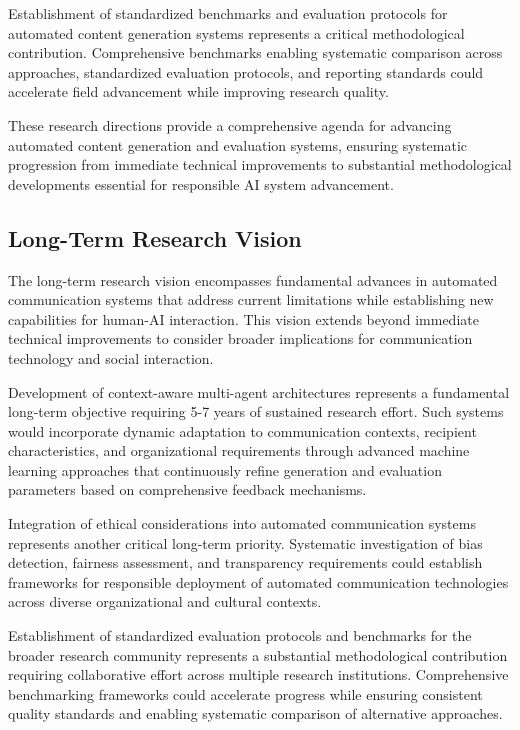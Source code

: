 Establishment of standardized benchmarks and evaluation protocols for automated content generation systems represents a critical methodological contribution. Comprehensive benchmarks enabling systematic comparison across approaches, standardized evaluation protocols, and reporting standards could accelerate field advancement while improving research quality.

These research directions provide a comprehensive agenda for advancing automated content generation and evaluation systems, ensuring systematic progression from immediate technical improvements to substantial methodological developments essential for responsible AI system advancement.

\subsection{Long-Term Research Vision}

The long-term research vision encompasses fundamental advances in automated communication systems that address current limitations while establishing new capabilities for human-AI interaction. This vision extends beyond immediate technical improvements to consider broader implications for communication technology and social interaction.

Development of context-aware multi-agent architectures represents a fundamental long-term objective requiring 5-7 years of sustained research effort. Such systems would incorporate dynamic adaptation to communication contexts, recipient characteristics, and organizational requirements through advanced machine learning approaches that continuously refine generation and evaluation parameters based on comprehensive feedback mechanisms.

Integration of ethical considerations into automated communication systems represents another critical long-term priority. Systematic investigation of bias detection, fairness assessment, and transparency requirements could establish frameworks for responsible deployment of automated communication technologies across diverse organizational and cultural contexts.

Establishment of standardized evaluation protocols and benchmarks for the broader research community represents a substantial methodological contribution requiring collaborative effort across multiple research institutions. Comprehensive benchmarking frameworks could accelerate progress while ensuring consistent quality standards and enabling systematic comparison of alternative approaches.


